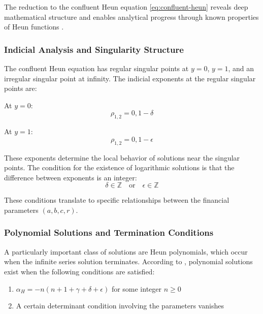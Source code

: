 \documentclass[a4paper,11pt]{article}
\begin{document}
The reduction to the confluent Heun equation \eqref{eq:confluent-heun} reveals deep mathematical structure and enables analytical progress through known properties of Heun functions \cite{Fiziev2009,Ronveaux1995,SlavyanovLay2000}.

\subsubsection{Indicial Analysis and Singularity Structure}

The confluent Heun equation has regular singular points at $y = 0$, $y = 1$, and an irregular singular point at infinity. The indicial exponents at the regular singular points are:

At $y = 0$:
\begin{equation}
\rho_{1,2} = 0, 1 - \delta
\end{equation}

At $y = 1$:
\begin{equation}
\rho_{1,2} = 0, 1 - \epsilon
\end{equation}

These exponents determine the local behavior of solutions near the singular points. The condition for the existence of logarithmic solutions is that the difference between exponents is an integer:
\begin{equation}
\delta \in \mathbb{Z} \quad \text{or} \quad \epsilon \in \mathbb{Z}
\end{equation}

These conditions translate to specific relationships between the financial parameters $(a, b, c, r)$.

\subsubsection{Polynomial Solutions and Termination Conditions}

A particularly important class of solutions are Heun polynomials, which occur when the infinite series solution terminates. According to \cite{Fiziev2009}, polynomial solutions exist when the following conditions are satisfied:

\begin{enumerate}
\item $\alpha_H = -n(n + 1 + \gamma + \delta + \epsilon)$ for some integer $n \geq 0$
\item A certain determinant condition involving the parameters vanishes
\end{enumerate}
\end{document}
